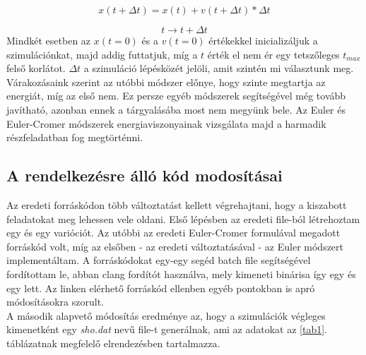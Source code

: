 \begin{multicols}{2}
\begin{equation}
    x \left(t + \Delta t \right) = x \left( t \right) + v \left( t + \Delta t \right) * \Delta t
\end{equation}

\begin{equation}
    t \to t + \Delta t
\end{equation}
Mindkét esetben az $x \left( t = 0 \right)$ és a $v \left( t = 0 \right)$ értékekkel inicializáljuk a szimulációnkat, majd addig futtatjuk, míg a $t$ érték el nem ér egy tetszőleges $t_{max}$ felső korlátot. $\Delta t$ a szimuláció lépésközét jelöli, amit szintén mi választunk meg. \\
Várakozásaink szerint az utóbbi módszer előnye, hogy szinte megtartja az energiát, míg az első nem\cite{cromer}. Ez persze egyéb módszerek segítségével még tovább javítható, azonban ennek a tárgyalásába most nem megyünk bele\cite{Iserles-2003}. Az Euler és Euler-Cromer módszerek energiaviszonyainak vizsgálata majd a harmadik részfeladatban fog megtörténni.

\subsection{A rendelkezésre álló kód modosításai}
Az eredeti forráskódon több változtatást kellett végrehajtani, hogy a kiszabott feladatokat meg lehessen vele oldani. Első lépésben az eredeti  file-ból létrehoztam egy  és egy  varióciót. Az utóbbi az eredeti Euler-Cromer formulával megadott forráskód volt, míg az elsőben - az eredeti változtatásával - az Euler módszert implementáltam. A forráskódokat egy-egy segéd batch file segítségével fordítottam le, abban clang fordítót használva, mely kimeneti binárisa így egy  és egy  lett. Az \cite{szamszin} linken elérhető forráskód ellenben egyéb pontokban is apró módosításokra szorult. \\
A második alapvető módosítás eredménye az, hogy a szimulációk végleges kimenetként egy \emph{sho.dat} nevű file-t generálnak, ami az adatokat az \ref{tab1}. táblázatnak megfelelő elrendezésben tartalmazza.


\end{multicols}
